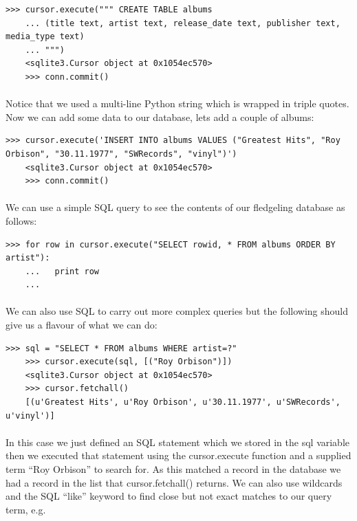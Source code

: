 \documentclass[12pt, a4paper, oneside]{book}
\begin{document}
{\begin{lstlisting}[style=DOS]
    >>> cursor.execute(""" CREATE TABLE albums
    ... (title text, artist text, release_date text, publisher text, media_type text)
    ... """)
    <sqlite3.Cursor object at 0x1054ec570>
    >>> conn.commit()
\end{lstlisting}

\paragraph{} Notice that we used a multi-line Python string which is wrapped in triple quotes. Now we can add some data to our database, lets add a couple of albums:

\begin{lstlisting}[style=DOS]
    >>> cursor.execute('INSERT INTO albums VALUES ("Greatest Hits", "Roy Orbison", "30.11.1977", "SWRecords", "vinyl")')
    <sqlite3.Cursor object at 0x1054ec570>
    >>> conn.commit()
\end{lstlisting}

\paragraph{} We can use a simple SQL query to see the contents of our fledgeling database as follows:

\begin{lstlisting}[style=DOS]
    >>> for row in cursor.execute("SELECT rowid, * FROM albums ORDER BY artist"):
    ...   print row
    ...
\end{lstlisting}

\paragraph{} We can also use SQL to carry out more complex queries but the following should give us a flavour of what we can do:

\begin{lstlisting}[style=DOS]
    >>> sql = "SELECT * FROM albums WHERE artist=?"
    >>> cursor.execute(sql, [("Roy Orbison")])
    <sqlite3.Cursor object at 0x1054ec570>
    >>> cursor.fetchall()
    [(u'Greatest Hits', u'Roy Orbison', u'30.11.1977', u'SWRecords', u'vinyl')]
\end{lstlisting}

\paragraph{} In this case we just defined an SQL statement which we stored in the sql variable then we executed that statement using the cursor.execute function and a supplied term ``Roy Orbison'' to search for. As this matched a record in the database we had a record in the list that cursor.fetchall() returns. We can also use wildcards and the SQL ``like'' keyword to find close but not exact matches to our query term, e.g.

}
\end{document}
